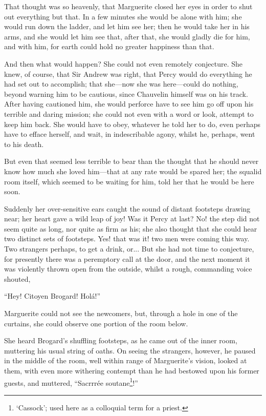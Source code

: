 That thought was so heavenly, that Marguerite closed her eyes in order to shut out everything but that. In a few minutes she would be alone with him; she would run down the ladder, and let him see her; then he would take her in his arms, and she would let him see that, after that, she would gladly die for him, and with him, for earth could hold no greater happiness than that.

And then what would happen? She could not even remotely conjecture. She knew, of course, that Sir Andrew was right, that Percy would do everything he had set out to accomplish; that she---now she was here---could do nothing, beyond warning him to be cautious, since Chauvelin himself was on his track. After having cautioned him, she would perforce have to see him go off upon his terrible and daring mission; she could not even with a word or look, attempt to keep him back. She would have to obey, whatever he told her to do, even perhaps have to efface herself, and wait, in indescribable agony, whilst he, perhaps, went to his death.

But even that seemed less terrible to bear than the thought that he should never know how much she loved him---that at any rate would be spared her; the squalid room itself, which seemed to be waiting for him, told her that he would be here soon.

Suddenly her over-sensitive ears caught the sound of distant footsteps drawing near; her heart gave a wild leap of joy! Was it Percy at last? No! the step did not seem quite as long, nor quite as firm as his; she also thought that she could hear two distinct sets of footsteps. Yes! that was it! two men were coming this way. Two strangers perhaps, to get a drink, or... But she had not time to conjecture, for presently there was a peremptory call at the door, and the next moment it was violently thrown open from the outside, whilst a rough, commanding voice shouted,\longdash


\enquote{Hey! Citoyen Brogard! Holá!}

Marguerite could not see the newcomers, but, through a hole in one of the curtains, she could observe one portion of the room below.

She heard Brogard's shuffling footsteps, as he came out of the inner room, muttering his usual string of oaths. On seeing the strangers, however, he paused in the middle of the room, well within range of Marguerite's vision, looked at them, with even more withering contempt than he had bestowed upon his former guests, and muttered, \enquote{Sacrrrée soutane\footnote{\enquote{Cassock}; used here as a colloquial term for a priest.}!}

